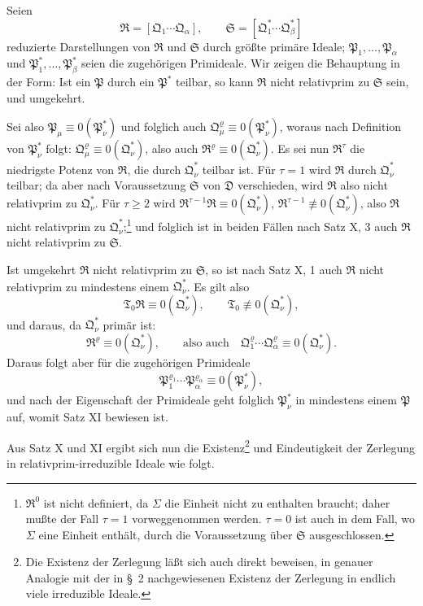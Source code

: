 \documentclass[11pt]{article}
\newcommand{\ideal}[1]{\mathfrak{#1}}
\begin{document}
Seien
\[
 \ideal R=[\ideal Q_1\cdots\ideal Q_\alpha],\qquad
 \ideal S=[\ideal Q_1^*\cdots\ideal Q_\beta^*]
\]
reduzierte Darstellungen von $\ideal R$ und $\ideal S$ durch größte primäre Ideale; $\ideal P_1,
\ldots,\ideal P_\alpha$ und $\ideal P_1^*,
\ldots,\ideal P_\beta^*$ seien die zugehörigen Primideale. Wir zeigen die Behauptung in der Form: Ist ein $\ideal P$ durch ein $\ideal P^*$ teilbar, so kann $\ideal R$ nicht relativprim zu $\ideal S$ sein, und umgekehrt.

Sei also $\ideal P_\mu\equiv0(\ideal P_\nu^*)$ und folglich auch $\ideal Q_\mu^{\varrho}\equiv0(\ideal P_\nu^*)$, woraus nach Definition von $\ideal P_\nu^*$ folgt: $\ideal Q_\mu^{\varrho}\equiv0(\ideal Q_\nu^*)$, also auch $\ideal R^{\varrho}\equiv0(\ideal Q_\nu^*)$. Es sei nun $\ideal R^\tau$ die niedrigste Potenz von $\ideal R$, die durch $\ideal Q_\nu^*$ teilbar ist. Für $\tau=1$ wird $\ideal R$ durch $\ideal Q_\nu^*$ teilbar; da aber nach Voraussetzung $\ideal S$ von $\ideal D$ verschieden, wird $\ideal R$ also nicht relativprim zu $\ideal Q_\nu^*$. Für $\tau\ge2$ wird $\ideal R^{\tau-1}\ideal R\equiv0(\ideal Q_\nu^*)$, $\ideal R^{\tau-1}\not\equiv0(\ideal Q_\nu^*)$, also $\ideal R$ nicht relativprim zu $\ideal Q_\nu^*$;\footnote{$\ideal R^0$ ist nicht definiert, da $\Sigma$ die Einheit nicht zu enthalten braucht; daher mußte der Fall $\tau=1$ vorweggenommen werden. $\tau=0$ ist auch in dem Fall, wo $\Sigma$ eine Einheit enthält, durch die Voraussetzung über $\ideal S$ ausgeschlossen.} und folglich ist in beiden Fällen nach Satz X, 3 auch $\ideal R$ nicht relativprim zu $\ideal S$.

Ist umgekehrt $\ideal R$ nicht relativprim zu $\ideal S$, so ist nach Satz X, 1 auch $\ideal R$ nicht relativprim zu mindestens einem $\ideal Q_\nu^*$. Es gilt also
\[
 \ideal T_0\ideal R\equiv0(\ideal Q_\nu^*),\qquad
 \ideal T_0\not\equiv0(\ideal Q_\nu^*),
\]
und daraus, da $\ideal Q_\nu^*$ primär ist:
\[
 \ideal R^\varrho\equiv0(\ideal Q_\nu^*),\qquad
 \text{also auch}\quad
 \ideal Q_1^{\varrho}\cdots\ideal Q_\alpha^{\varrho}\equiv0(\ideal Q_\nu^*).
\]
Daraus folgt aber für die zugehörigen Primideale
\[
 \ideal P_1^{\varrho_1}\cdots\ideal P_\alpha^{\varrho_\alpha}\equiv0(\ideal P_\nu^*),
\]
und nach der Eigenschaft der Primideale geht folglich $\ideal P_\nu^*$ in mindestens einem $\ideal P$ auf, womit Satz XI bewiesen ist.

Aus Satz X und XI ergibt sich nun die Existenz\footnote{Die Existenz der Zerlegung läßt sich auch direkt beweisen, in genauer Analogie mit der in \S~2 nachgewiesenen Existenz der Zerlegung in endlich viele irreduzible Ideale.} und Eindeutigkeit der Zerlegung in relativprim-irreduzible Ideale wie folgt.
\end{document}
